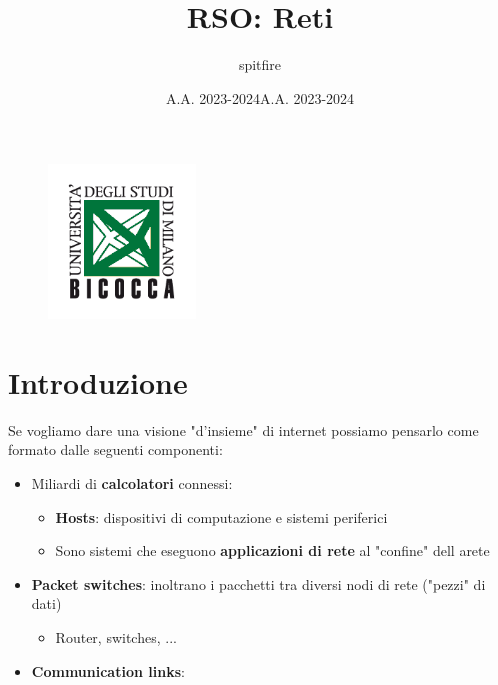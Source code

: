 \documentclass[12pt]{article}
\title{RSO: Reti}
\author{spitfire}
\date{A.A. 2023-2024}
\begin{document}
\begin{figure}
    \centering
    \includegraphics[width=0.35\textwidth]{Images/Logo scienze bicocca.png}
\end{figure}

\vspace{10cm}
\date{A.A. 2023-2024}


\maketitle

\newpage

\tableofcontents
\newpage
\section{Introduzione}
Se vogliamo dare una visione "d'insieme" di internet possiamo pensarlo come formato dalle
seguenti componenti:
\begin{itemize}
    \item Miliardi di \textbf{calcolatori} connessi:
    \begin{itemize}
        \item \textbf{Hosts}: dispositivi di computazione e sistemi periferici
        \item Sono sistemi che eseguono \textbf{applicazioni di rete} al "confine" dell arete
    \end{itemize}
    \item \textbf{Packet switches}: inoltrano i pacchetti tra diversi nodi di rete ("pezzi" di dati)
    \begin{itemize}
        \item Router, switches, ...
    \end{itemize}
    \item \textbf{Communication links}: 
\end{itemize}
\end{document}
